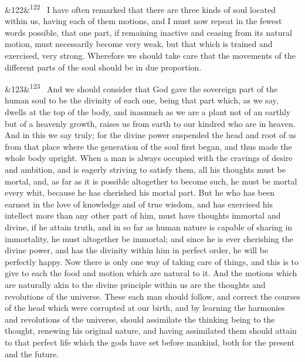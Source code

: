 \documentclass[12pt]{article}
\newcommand{\para}[1][]{\par\noindent\ifx&#1&\else\textsuperscript{\footnotesize #1}~\fi}
\begin{document}
\para[122] I have often remarked that there are three kinds of soul located within us, having each of them motions, and I must now repeat in the fewest words possible, that one part, if remaining inactive and ceasing from its natural motion, must necessarily become very weak, but that which is trained and exercised, very strong. Wherefore we should take care that the movements of the different parts of the soul should be in due proportion.

\para[123] And we should consider that God gave the sovereign part of the human soul to be the divinity of each one, being that part which, as we say, dwells at the top of the body, and inasmuch as we are a plant not of an earthly but of a heavenly growth, raises us from earth to our kindred who are in heaven. And in this we say truly; for the divine power suspended the head and root of us from that place where the generation of the soul first began, and thus made the whole body upright. When a man is always occupied with the cravings of desire and ambition, and is eagerly striving to satisfy them, all his thoughts must be mortal, and, as far as it is possible altogether to become such, he must be mortal every whit, because he has cherished his mortal part. But he who has been earnest in the love of knowledge and of true wisdom, and has exercised his intellect more than any other part of him, must have thoughts immortal and divine, if he attain truth, and in so far as human nature is capable of sharing in immortality, he must altogether be immortal; and since he is ever cherishing the divine power, and has the divinity within him in perfect order, he will be perfectly happy. Now there is only one way of taking care of things, and this is to give to each the food and motion which are natural to it. And the motions which are naturally akin to the divine principle within us are the thoughts and revolutions of the universe. These each man should follow, and correct the courses of the head which were corrupted at our birth, and by learning the harmonies and revolutions of the universe, should assimilate the thinking being to the thought, renewing his original nature, and having assimilated them should attain to that perfect life which the gods have set before mankind, both for the present and the future.
\end{document}
